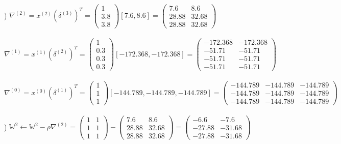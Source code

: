 \documentclass[12pt]{article}
\begin{document}
\noindent \hrulefill \\\pagebreak



) $\nabla^{(2)} = x^{(2)}(\delta^{(3)})^T = 
\begin{pmatrix}
1\\ 3.8\\ 3.8
\end{pmatrix}
[7.6, 8.6] = 
\begin{pmatrix}
7.6 & 8.6 \\
28.88 & 32.68 \\
28.88 & 32.68
\end{pmatrix}
$\\\\

\indent $\nabla^{(1)} = x^{(1)}(\delta^{(2)})^T = 
\begin{pmatrix}
1\\ 0.3\\ 0.3 \\ 0.3
\end{pmatrix}
[-172.368, -172.368] = 
\begin{pmatrix}
-172.368 & -172.368 \\
-51.71 & -51.71 \\
-51.71 & -51.71 \\
-51.71 & -51.71 
\end{pmatrix}
$\\\\

\indent $\nabla^{(0)} = x^{(0)}(\delta^{(1)})^T = 
\begin{pmatrix}
1\\ 1\\ 1
\end{pmatrix}
[-144.789, -144.789, -144.789] = 
\begin{pmatrix}
-144.789 & -144.789 & -144.789 \\
-144.789 & -144.789 & -144.789 \\
-144.789 & -144.789 & -144.789 
\end{pmatrix}
$\\



\noindent \hrulefill \\



) $\mathbb{W}^{2} \leftarrow \mathbb{W}^{2} - \rho\nabla^{(2)} = 
\begin{pmatrix}
1 & 1 \\
1 & 1 \\
1 & 1 
\end{pmatrix} - 
\begin{pmatrix}
7.6 & 8.6 \\
28.88 & 32.68 \\
28.88 & 32.68
\end{pmatrix} = 
\begin{pmatrix}
-6.6 & -7.6 \\
-27.88 & -31.68 \\
-27.88 & -31.68
\end{pmatrix}
$\\\\
\end{document}
